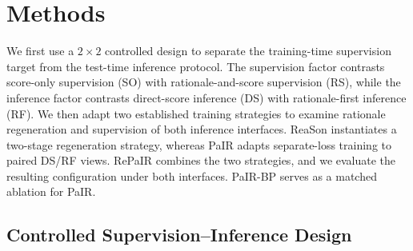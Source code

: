 \section{Methods}
\label{sec:methods}     %


We first use a $2\times2$ controlled design to separate the
training-time supervision target from the test-time inference protocol.
The supervision factor contrasts score-only supervision (SO) with
rationale-and-score supervision (RS), while the inference factor
contrasts direct-score inference (DS) with rationale-first inference
(RF). We then adapt two established training strategies to examine
rationale regeneration and supervision of both inference interfaces.
ReaSon instantiates a two-stage regeneration strategy, whereas PaIR
adapts separate-loss training to paired DS/RF views. RePaIR combines
the two strategies, and we evaluate the resulting configuration under
both interfaces.
PaIR-BP serves as a matched ablation for PaIR.

\subsection{Controlled Supervision--Inference Design}


